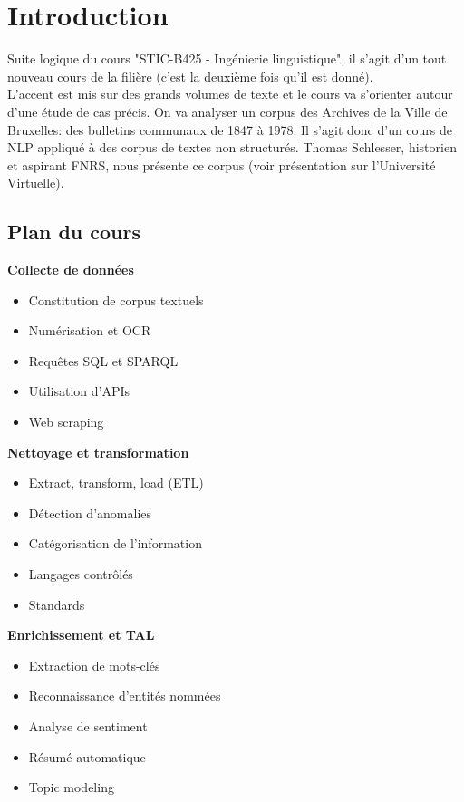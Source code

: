\vspace{-1.2cm}

\section{Introduction}

Suite logique du cours "STIC-B425 - Ingénierie linguistique", il s'agit d'un tout nouveau cours
de la filière (c'est la deuxième fois qu'il est donné).\\

L'accent est mis sur des grands volumes de texte et le cours va s'orienter autour d'une étude de cas précis.
On va analyser un corpus des Archives de la Ville de Bruxelles: des bulletins communaux de 1847 à 1978.
Il s'agit donc d'un cours de NLP appliqué à des corpus de textes non structurés.
Thomas Schlesser, historien et aspirant FNRS, nous présente ce corpus (voir présentation sur l'Université Virtuelle).\\

\subsection{Plan du cours}

\noindent\textbf{Collecte de données}
\begin{itemize}
\item Constitution de corpus textuels
\item Numérisation et OCR
\item Requêtes SQL et SPARQL
\item Utilisation d'APIs
\item Web scraping\\
\end{itemize}

\noindent\textbf{Nettoyage et transformation}
\begin{itemize}
\item Extract, transform, load (ETL)
\item Détection d’anomalies
\item Catégorisation de l’information
\item Langages contrôlés
\item Standards\\
\end{itemize}

\noindent\textbf{Enrichissement et TAL}
\begin{itemize}
\item Extraction de mots-clés
\item Reconnaissance d'entités nommées
\item Analyse de sentiment
\item Résumé automatique
\item Topic modeling\\
\end{itemize}

